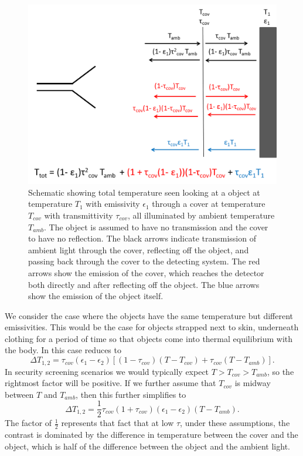 \begin{figure}
\centering
\includegraphics[width=6in]{images/ch1-t-tot.png}
\caption[Apparent temperature of a covered illuminated object]{
  Schematic showing total temperature seen looking at a object at temperature $T_1$ with emissivity $\epsilon_1$ through a cover at temperature $T_{cov}$ with transmittivity $\tau_{cov}$, all illuminated by ambient temperature $T_{amb}$.
  The object is assumed to have no transmission and the cover to have no reflection.
  The black arrows indicate transmission of ambient light through the cover, reflecting off the object, and passing back through the cover to the detecting system.
  The red arrows show the emission of the cover, which reaches the detector both directly and after reflecting off the object.
  The blue arrows show the emission of the object itself.
}
\label{fig:ch1-t-tot}
\end{figure}

We consider the case where the objects have the same temperature but different emissivities.
This would be the case for objects strapped next to skin, underneath clothing for a period of time so that objects come into thermal equilibrium with the body.
In this case  reduces to
\begin{equation}
  \Delta T_{1,2} = \tau_{cov} (\epsilon_1 - \epsilon_2) \left[ (1 - \tau_{cov}) (T - T_{cov}) + \tau_{cov} (T - T_{amb}) \right].
\end{equation}
In security screening scenarios we would typically expect $T > T_{cov} > T_{amb}$, so the rightmost factor will be positive.
If we further assume that $T_{cov}$ is midway between $T$ and $T_{amb}$, then this further simplifies to
\begin{equation} \label{eqn:ch1-delta-t-simple}
  \Delta T_{1,2} = \frac{1}{2}\tau_{cov}(1+\tau_{cov}) (\epsilon_1 - \epsilon_2) (T - T_{amb}).
\end{equation}
The factor of $\frac{1}{2}$ represents that fact that at low $\tau$, under these assumptions, the contrast is dominated by the difference in temperature between the cover and the object, which is half of the difference between the object and the ambient light.

